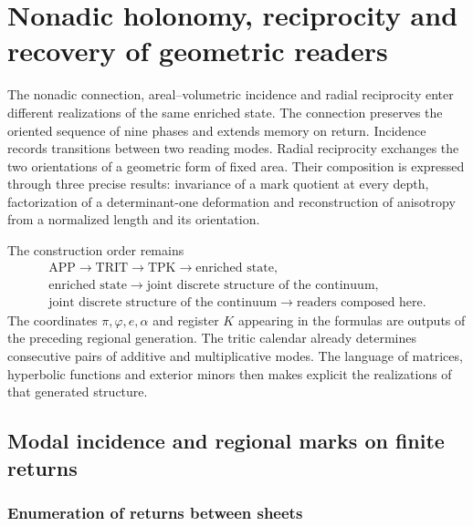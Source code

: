 \chapter{Nonadic holonomy, reciprocity and recovery of geometric readers}
\label{hrr:capitulo}

The nonadic connection, areal--volumetric incidence and radial reciprocity enter different realizations of the same enriched state. The connection preserves the oriented sequence of nine phases and extends memory on return. Incidence records transitions between two reading modes. Radial reciprocity exchanges the two orientations of a geometric form of fixed area. Their composition is expressed through three precise results: invariance of a mark quotient at every depth, factorization of a determinant-one deformation and reconstruction of anisotropy from a normalized length and its orientation.

The construction order remains
\[
 \begin{gathered}
 \mathrm{APP}\longrightarrow\mathrm{TRIT}\longrightarrow\mathrm{TPK}
 \longrightarrow\text{enriched state},\\
 \text{enriched state}
 \longrightarrow\text{joint discrete structure of the continuum},\\
 \text{joint discrete structure of the continuum}
 \longrightarrow\text{readers composed here}.
 \end{gathered}
\]
The coordinates \(\pi,\varphi,e,\alpha\) and register \(K\) appearing in the formulas are outputs of the preceding regional generation. The tritic calendar already determines consecutive pairs of additive and multiplicative modes. The language of matrices, hyperbolic functions and exterior minors then makes explicit the realizations of that generated structure.

\section{Modal incidence and regional marks on finite returns}
\label{hrr:incidencia}

\subsection{Enumeration of returns between sheets}

